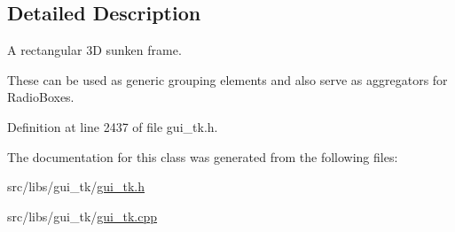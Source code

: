 \subsection{Detailed Description}
A rectangular 3\-D sunken frame. 

These can be used as generic grouping elements and also serve as aggregators for Radio\-Boxes. 

Definition at line 2437 of file gui\-\_\-tk.\-h.



The documentation for this class was generated from the following files\-:\begin{DoxyCompactItemize}
\item 
src/libs/gui\-\_\-tk/\hyperlink{gui__tk_8h}{gui\-\_\-tk.\-h}\item 
src/libs/gui\-\_\-tk/\hyperlink{gui__tk_8cpp}{gui\-\_\-tk.\-cpp}\end{DoxyCompactItemize}
